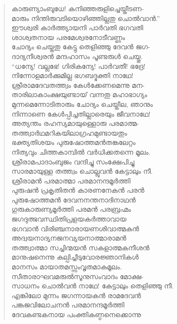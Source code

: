 \begin{verse}
കാരുണ്യാംബുധേ! കനിഞ്ഞരുളിച്ചെയ്തീടണ-\\
മാരും നിന്തിരുവടിയൊഴിഞ്ഞില്ലതു ചൊല്‍വാന്‍.”\\
ഈശ്വരി കാര്‍ത്ത്യായനി പാര്‍വതി ഭഗവതി\\
ശാശ്വതനായ പരമേശ്വരനോടീവണ്ണം\\
ചോദ്യം ചെയ്തതു കേട്ടു തെളിഞ്ഞു ദേവന്‍ ജഗ-\\
ദാദ്യനീശ്വരന്‍ മന്ദഹാസം പൂണ്ടരുള്‍ ചെയ്തു.\\
“ധന്യേ! വല്ലഭേ! ഗിരികന്യേ! പാര്‍വതീ! ഭദ്രേ!\\
നിന്നോളമാര്‍ക്കുമില്ല ഭഗബദ്ഭക്തി നാഥേ!\\
ശ്രീരാമദേവതത്ത്വം കേള്‍ക്കേണമെന്നു മന-\\
താരിലാകാംക്ഷയുണ്ടായ് വന്നതു മഹാഭാഗ്യം\\
മുന്നമെന്നോടിതാരും ചോദ്യം ചെയ്തീല, ഞാനും\\
നിന്നാണെ കേള്‍പ്പിച്ചതില്ലാരെയും ജീവനാഥേ!\\
അത്യന്തം രഹസ്യമായുള്ളൊരു പരമാത്മ-\\
തത്ത്വാര്‍ഥമറികയിലാഗ്രഹമുണ്ടായതും\\
ഭക്ത്യതിശയം പുരുഷോത്തമന്‍തങ്കലേറ്റം\\
നിത്യവും ചിത്തകാമ്പില്‍ വര്‍ധിക്കതന്നെ മൂലം.\\
ശ്രീരാമപാദാംബുജം വന്ദിച്ചു സംക്ഷേപിച്ചു\\
സാരമായുള്ള തത്ത്വം ചൊല്ലുവന്‍ കേട്ടാലും നീ.\\
ശ്രീരാമന്‍ പരമാത്മാ പരമാനന്ദമൂര്‍ത്തി\\
പുരുഷന്‍ പ്രകൃതിതന്‍ കാരണനേകന്‍ പരന്‍\\
പുരുഷോത്തമന്‍ ദേവനനന്തനാദിനാഥന്‍\\
ഗുരുകാരുണ്യമൂര്‍ത്തി പരമന്‍ പരബ്രഹ്മം\\
ജഗദുത്ഭവസ്ഥിതിപ്രളയകര്‍ത്താവായ\\
ഭഗവാന്‍ വിരിഞ്ചനാരായണശിവാത്മകന്‍\\
അദ്വയനാദ്യനജനവ്യയനാത്മാരാമന്‍\\
തത്ത്വാത്മാ സച്ചിന്മയന്‍ സകളാത്മകനീശന്‍\\
മാനുഷനെന്നു കല്പിച്ചീടുവോരജ്ഞാനികള്‍\\
മാനസം മായാതമസ്സംവൃതമാകമൂലം.\\
സീതാരാഘവമരുല്‍സൂനുസംവാദം മോക്ഷ-\\
സാധനം ചൊല്‍വന്‍ നാഥേ! കേട്ടാലും തെളിഞ്ഞു നീ.\\
എങ്കിലോ മുന്നം ജഗന്നായകന്‍ രാമദേവന്‍\\
പങ്കജവിലോചനന്‍ പരമാനന്ദമൂര്‍ത്തി\\
ദേവകണ്ടകനായ പംക്തികണ്ഠനെക്കൊന്നു\\

\end{verse}
